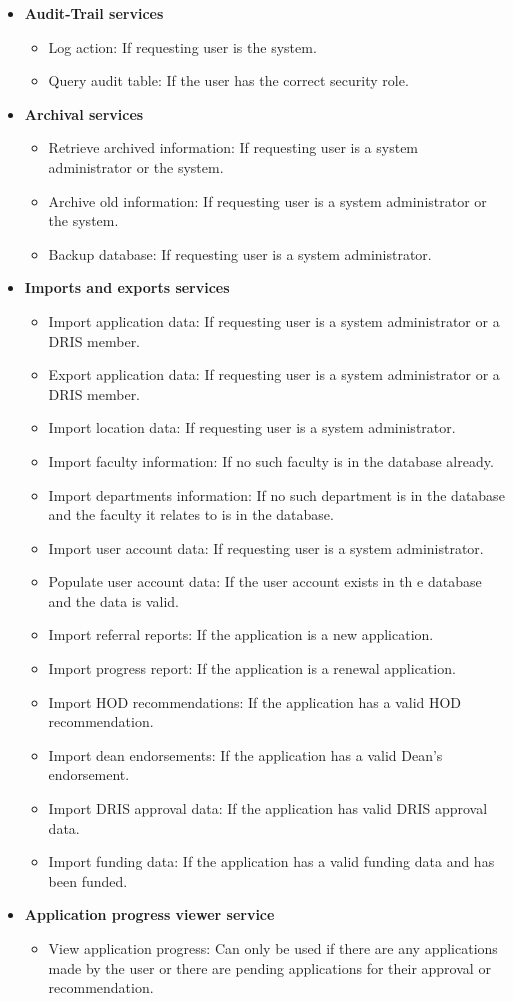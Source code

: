 \documentclass[12pt]{article}
\begin{document}
\begin{itemize}
	\item \textbf{Audit-Trail services}
		\begin{itemize}
			\item Log action: If requesting user is the system.
			\item Query audit table: If the user has the correct security role.										
		\end{itemize}
	\item \textbf{Archival services}
		\begin{itemize}
			\item Retrieve archived information: If requesting user is a system administrator or the system.
			\item Archive old information: If requesting user is a system administrator or the system.	
			\item Backup database: If requesting user is a system administrator.					
		\end{itemize}
	\item \textbf{Imports and exports services}
		\begin{itemize}
			\item Import application data: If requesting user is a system administrator or a DRIS member.
			\item Export application data: If requesting user is a system administrator or a DRIS member.	
			\item Import location data: If requesting user is a system administrator.
			\item Import faculty information: If no such faculty is in the database already.
			\item Import departments information: If no such department is in the database and the faculty it relates to is in the database.
			\item Import user account data: If requesting user is a system administrator.
			\item Populate user account data: If the user account exists in th e database and the data is valid.
			\item Import referral reports: If the application is a new application.
			\item Import progress report: If the application is a renewal application.
			\item Import HOD recommendations: If the application has a valid HOD recommendation.
			\item Import dean endorsements: If the application has a valid Dean's endorsement.
			\item Import DRIS approval data: If the application has valid DRIS approval data.
			\item Import funding data: If the application has a valid funding data and has been funded.				
		\end{itemize}		
	\item \textbf{Application progress viewer service}
		\begin{itemize}
			\item View application progress: Can only be used if there are any applications made by the user or there are pending applications for their approval or recommendation.
		\end{itemize}
		

\end{itemize}
\end{document}
